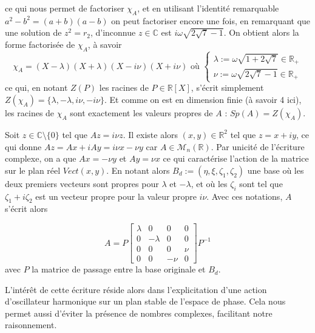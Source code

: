 \documentclass[12pt]{article}
\theoremstyle{definition}
\theoremstyle{definition}
\begin{document}
	ce qui nous permet de factoriser $\chi_A$, et en utilisant l'identité remarquable $a^2-b^2 = (a+b)(a-b)$ on peut factoriser encore une fois, en remarquant que une solution de $z^2 = r_2$, d'inconnue $z \in \mathbb{C}$ est $i\omega\sqrt{2\sqrt{7}-1}$. On obtient alors la forme factorisée de $\chi_A$, à savoir
	\begin{equation}
		\label{polynome carac A scindé}
		\chi_A = (X-\lambda)(X+\lambda)(X-i\nu)(X+i\nu)
	\text{ où }
	\begin{cases}
		\lambda := \omega\sqrt{1+2\sqrt{7}} \in \mathbb{R}_+
		\\
		\nu := \omega\sqrt{2\sqrt{7}-1} \in \mathbb{R}_+
	\end{cases}
	\end{equation}
	ce qui, en notant $Z(P)$ les racines de $P \in \mathbb{R}[X]$, s'écrit simplement $Z(\chi_A) = \{\lambda, -\lambda, i\nu, -i\nu\}$. Et comme on est en dimension finie (à savoir 4 ici), les racines de $\chi_A$ sont exactement les valeurs propres de $A$ : $Sp(A) = Z(\chi_A)$.
	
	Soit $z \in \mathbb{C} \setminus \{0\}$ tel que $Az = i\nu z$. Il existe alors $(x,y) \in \mathbb{R}^2$ tel que $z=x+iy$, ce qui donne $Az = Ax + iAy = i\nu x - \nu y$ car $A \in \mathcal{M}_n(\mathbb{R})$. Par unicité de l'écriture complexe, on a que $Ax = -\nu y$ et $Ay = \nu x$ ce qui caractérise l'action de la matrice sur le plan réel $Vect(x,y)$. En notant alors $B_d := (\eta,\xi,\zeta_1,\zeta_2)$ une base où les deux premiers vecteurs sont propres pour $\lambda$ et $-\lambda$, et où les $\zeta_i$ sont tel que $\zeta_1 + i\zeta_2$ est un vecteur propre pour la valeur propre $i\nu$. Avec ces notations, $A$ s'écrit alors
	
	\begin{equation}
		\label{eq du mvt dz}
		A
		=
		P
		\begin{bmatrix}
			\lambda & 0 & 0 & 0
			\\
			0 & -\lambda & 0 & 0
			\\
			0 & 0 & 0 & \nu
			\\
			0 & 0 & -\nu & 0
		\end{bmatrix}
		P^{-1}
	\end{equation}
	avec $P$ la matrice de passage entre la base originale et $B_d$.
	
	L'intérêt de cette écriture réside alors dans l'explicitation d'une action d'oscillateur harmonique sur un plan stable de l'espace de phase. Cela nous permet aussi d'éviter la présence de nombres complexes, facilitant notre raisonnement.
	
\end{document}
